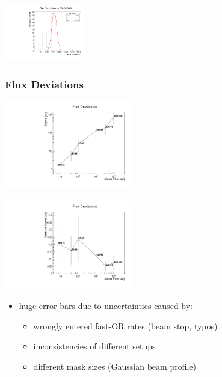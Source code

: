 \documentclass[9pt]{beamer}
\begin{document}
\begin{frame}
\begin{minipage}{3.5cm}
	\end{minipage}
	\hspace*{2pt}
	\begin{minipage}{3.5cm}
		\centering
		\includegraphics[angle=270, width=3.5cm]{FluxDistribution280_130}
	\end{minipage}\s
\end{frame}
\begin{frame}
	\frametitle{Flux Deviations}
	\begin{minipage}{5.5cm}
		\centering
		\includegraphics[angle=270, width=5.5cm]{FluxVariations}
	\end{minipage}
	\hspace*{2pt}
	\begin{minipage}{5.5cm}
		\centering
		\includegraphics[angle=270, width=5.5cm]{FluxVariationsRel}
	\end{minipage}
	\begin{itemize}
		\item huge error bars due to uncertainties caused by:
		\begin{itemize}
			\item wrongly entered fast-OR rates (beam stop, typos)
			\item inconsistencies of different setups
			\item different mask sizes (Gaussian beam profile)
		\end{itemize}
	\end{itemize}
\end{frame}
\end{document}
